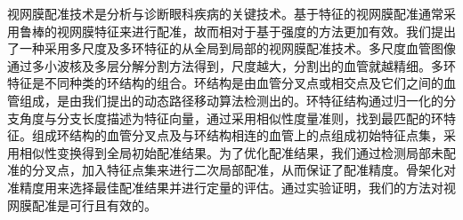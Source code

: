 视网膜配准技术是分析与诊断眼科疾病的关键技术。基于特征的视网膜配准通常采用鲁棒的视网膜特征来进行配准，故而相对于基于强度的方法更加有效。我们提出了一种采用多尺度及多环特征的从全局到局部的视网膜配准技术。多尺度血管图像通过多小波核及多层分解分割方法得到，尺度越大，分割出的血管就越精细。多环特征是不同种类的环结构的组合。环结构是由血管分叉点或相交点及它们之间的血管组成，是由我们提出的动态路径移动算法检测出的。环特征结构通过归一化的分支角度与分支长度描述为特征向量，通过采用相似性度量准则，找到最匹配的环特征。组成环结构的血管分叉点及与环结构相连的血管上的点组成初始特征点集，采用相似性变换得到全局初始配准结果。为了优化配准结果，我们通过检测局部未配准的分叉点，加入特征点集来进行二次局部配准，从而保证了配准精度。骨架化对准精度用来选择最佳配准结果并进行定量的评估。通过实验证明，我们的方法对视网膜配准是可行且有效的。
